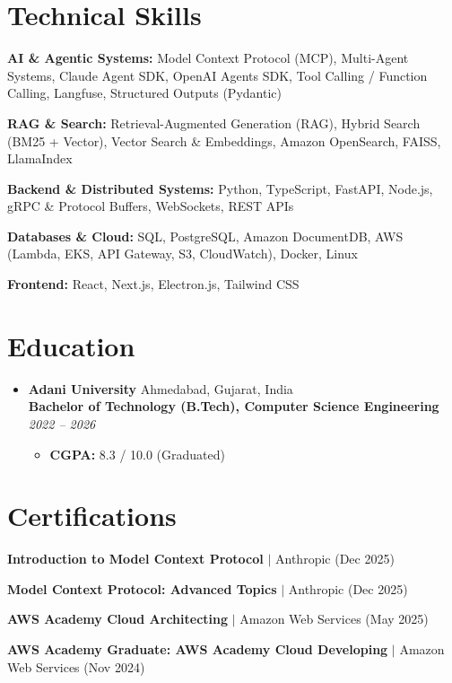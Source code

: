 \documentclass[letterpaper,10pt]{article}
\newcommand{\resumeItem}[1]{
	\item\small{#1}
}
\newcommand{\resumeEducationHeading}[4]{
	\vspace{-2pt}\item
	{\textbf{\normalsize #1} \hfill \small #2} \\
	{\textbf{\small #3} \hfill \textit{\small #4}} \vspace{-3pt}
}
\newcommand{\resumeSubHeadingListStart}{\begin{itemize}[leftmargin=0in, label={}]}
\newcommand{\resumeSubHeadingListEnd}{\end{itemize}\vspace{-4pt}}
\newcommand{\resumeItemListStart}{\begin{itemize}[leftmargin=0.15in, itemsep=2pt, parsep=0pt, topsep=2pt]}
\newcommand{\resumeItemListEnd}{\end{itemize}\vspace{-1pt}}
\begin{document}
	\section{Technical Skills}
	\begin{itemize}[leftmargin=0in, label={}, itemsep=1.5pt, parsep=0pt, topsep=1.5pt]
		\small{
			\item \textbf{AI \& Agentic Systems:} Model Context Protocol (MCP), Multi-Agent Systems, Claude Agent SDK, OpenAI Agents SDK, Tool Calling / Function Calling, Langfuse, Structured Outputs (Pydantic)
			\item \textbf{RAG \& Search:} Retrieval-Augmented Generation (RAG), Hybrid Search (BM25 + Vector), Vector Search \& Embeddings, Amazon OpenSearch, FAISS, LlamaIndex
			\item \textbf{Backend \& Distributed Systems:} Python, TypeScript, FastAPI, Node.js, gRPC \& Protocol Buffers, WebSockets, REST APIs
			\item \textbf{Databases \& Cloud:} SQL, PostgreSQL, Amazon DocumentDB, AWS (Lambda, EKS, API Gateway, S3, CloudWatch), Docker, Linux
			\item \textbf{Frontend:} React, Next.js, Electron.js, Tailwind CSS
		}
	\end{itemize}
	\vspace{-3pt}

	\section{Education}
	\resumeSubHeadingListStart
		\resumeEducationHeading
		{Adani University}{Ahmedabad, Gujarat, India}
		{Bachelor of Technology (B.Tech), Computer Science Engineering}{2022 -- 2026}
		\resumeItemListStart
			\resumeItem{\textbf{CGPA:} 8.3 / 10.0 (Graduated)}
		\resumeItemListEnd
	\resumeSubHeadingListEnd

	\section{Certifications}
	\begin{itemize}[leftmargin=0.15in, label=$\vcenter{\hbox{\tiny$\bullet$}}$, itemsep=1.5pt, parsep=0pt, topsep=1.5pt]
		\small{
			\item \textbf{Introduction to Model Context Protocol} $|$ Anthropic (Dec 2025)
			\item \textbf{Model Context Protocol: Advanced Topics} $|$ Anthropic (Dec 2025)
			\item \textbf{AWS Academy Cloud Architecting} $|$ Amazon Web Services (May 2025)
			\item \textbf{AWS Academy Graduate: AWS Academy Cloud Developing} $|$ Amazon Web Services (Nov 2024)
		}
	\end{itemize}
\end{document}
